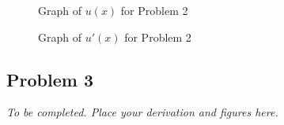 \documentclass[12pt, a4paper]{article}
\begin{document}
\begin{figure}[h]
  \centering
  \caption{Graph of \(u(x)\) for Problem 2}
\end{figure}

\begin{figure}[h]
  \centering
  \caption{Graph of \(u'(x)\) for Problem 2}
\end{figure}

\subsection*{Problem 3}
\textit{To be completed. Place your derivation and figures here.}

\newpage
\printbibliography
\end{document}
